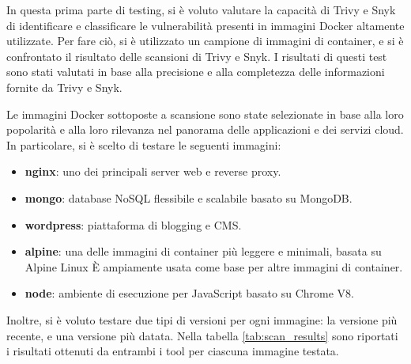 In questa prima parte di testing, si è voluto valutare la capacità di Trivy e Snyk di identificare e classificare le vulnerabilità presenti in immagini Docker altamente utilizzate. Per fare ciò, si è utilizzato un campione di immagini di container, e si è confrontato il risultato delle scansioni di Trivy e Snyk. I risultati di questi test sono stati valutati in base alla precisione e alla completezza delle informazioni fornite da Trivy e Snyk.

Le immagini Docker sottoposte a scansione sono state selezionate in base alla loro popolarità e alla loro rilevanza nel panorama delle applicazioni e dei servizi cloud. In particolare, si è scelto di testare le seguenti immagini:
\begin{itemize}
   \item\textbf{nginx}: uno dei principali server web e reverse proxy.
   \item\textbf{mongo}: database NoSQL flessibile e scalabile basato su MongoDB.
   \item\textbf{wordpress}: piattaforma di blogging e CMS.
   \item\textbf{alpine}: una delle immagini di container più leggere e minimali, basata su Alpine Linux È ampiamente usata come base per altre immagini di container.
   \item\textbf{node}: ambiente di esecuzione per JavaScript basato su Chrome V8.
\end{itemize}
Inoltre, si è voluto testare due tipi di versioni per ogni immagine: la versione più recente, e una versione più datata.
Nella tabella \ref{tab:scan_results} sono riportati i risultati ottenuti da entrambi i tool per ciascuna immagine testata.
